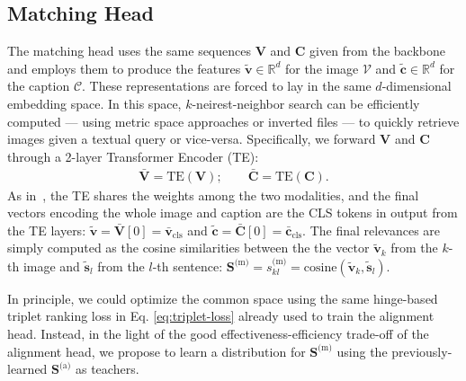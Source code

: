 \documentclass[sigconf]{acmart}
\begin{document}
\subsection{Matching Head}
\label{sec:matching-head}
The matching head uses the same sequences $\boldsymbol{V}$ and $\boldsymbol{C}$ given from the backbone and employs them to produce the features $\boldsymbol{\tilde{v}} \in \mathbb{R}^{d}$ for the image $\mathcal{V}$ and $\boldsymbol{\tilde{c}} \in \mathbb{R}^{d}$ for the caption $\mathcal{C}$. These representations are forced to lay in the same $d$-dimensional embedding space. In this space, $k$-neirest-neighbor search can be efficiently computed --- using metric space approaches or inverted files --- to quickly retrieve images given a textual query or vice-versa.
Specifically, we forward $\boldsymbol{V}$ and $\boldsymbol{C}$ through a 2-layer Transformer Encoder (TE):
\begin{align}
\boldsymbol{\bar{V}} = \text{TE}(\boldsymbol{V}); \qquad
\boldsymbol{\bar{C}} = \text{TE}(\boldsymbol{C}).
\end{align}
As in~\citep{messina2021transformer}, the TE shares the weights among the two modalities, and the final vectors encoding the whole image and caption are the CLS tokens in output from the TE layers: $\boldsymbol{\tilde{v}} = \boldsymbol{\bar{V}}[0] = \boldsymbol{\bar{v}}_\text{cls}$ and $\boldsymbol{\tilde{c}} = \boldsymbol{\bar{C}}[0] = \boldsymbol{\bar{c}}_\text{cls}$.
The final relevances are simply computed as the cosine similarities between the the vector $\boldsymbol{\tilde{v}}_k$ from the $k$-th image and $\boldsymbol{\tilde{s}}_l$ from the $l$-th sentence: $\boldsymbol{S}^\text{(m)} = s^\text{(m)}_{kl} = \text{cosine}(\boldsymbol{\tilde{v}}_k,\boldsymbol{\tilde{s}}_l)$.

In principle, we could optimize the common space using the same hinge-based triplet ranking loss in Eq. \ref{eq:triplet-loss} already used to train the alignment head. Instead, in the light of the good effectiveness-efficiency trade-off of the alignment head, we propose to learn a distribution for $\boldsymbol{S}^\text{(m)}$ using the previously-learned $\boldsymbol{S}^\text{(a)}$ as teachers.
\end{document}
